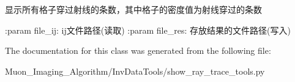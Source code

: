 \begin{DoxyVerb}显示所有格子穿过射线的条数，其中格子的密度值为射线穿过的条数

:param file_ij: ij文件路径(读取)
:param file_res: 存放结果的文件路径(写入)
\end{DoxyVerb}
 

The documentation for this class was generated from the following file\+:\begin{DoxyCompactItemize}
\item 
Muon\+\_\+\+Imaging\+\_\+\+Algorithm/\+Inv\+Data\+Tools/show\+\_\+ray\+\_\+trace\+\_\+tools.\+py\end{DoxyCompactItemize}
